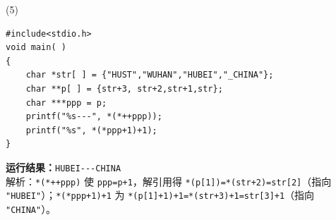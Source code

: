 \documentclass[a4paper,11pt]{ctexart}
\begin{document}
\vspace{4pt}
\noindent (5)
\begin{lstlisting}
#include<stdio.h>
void main( )
{
    char *str[ ] = {"HUST","WUHAN","HUBEI","_CHINA"};
    char **p[ ] = {str+3, str+2,str+1,str};
    char ***ppp = p;
    printf("%s---", *(*++ppp));
    printf("%s", *(*ppp+1)+1);
}
\end{lstlisting}
\noindent\hspace*{1.5em}\textcolor{ansred}{\textbf{运行结果：}\texttt{HUBEI-{}-{}-CHINA}}\\
\hspace*{1.5em}\textcolor{noteblue}{\small 解析：\texttt{*(*++ppp)} 使 \texttt{ppp=p+1}，解引用得 \texttt{*(p[1])=*(str+2)=str[2]}（指向 \texttt{"HUBEI"}）；\texttt{*(*ppp+1)+1} 为 \texttt{*(p[1]+1)+1=*(str+3)+1=str[3]+1}（指向 \texttt{"CHINA"}）。}
\end{document}
